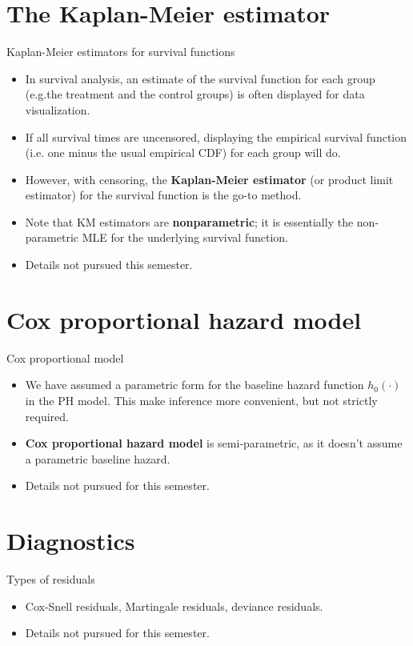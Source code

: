 \documentclass{beamer}
\newcommand{\currentsection}{}
\let\oldsection\section
\renewcommand{\section}[1]{\oldsection{#1}\renewcommand{\currentsection}{#1}}
\newenvironment{wideitemize}%
  {\begin{itemize}%
    \setlength{\parskip}{1em}}%
  {\end{itemize}}
\begin{document}
\section{The Kaplan-Meier estimator}

\begin{frame} {Kaplan-Meier estimators for survival functions}
\begin{wideitemize}
\item  In survival analysis,  an estimate of the survival function for each group (e.g.the  treatment and the control groups) is often displayed for data visualization. 


\item  If all survival times are uncensored, displaying the empirical survival function (i.e. one minus the usual empirical CDF) for each group will do. 

\item However, with censoring, the {\bf Kaplan-Meier estimator} (or product limit estimator) for the survival function is the go-to method. 


\item Note that KM estimators are {\bf nonparametric};  it is essentially the non-parametric MLE for the  underlying survival function. 


\item Details not pursued this semester. 
\end{wideitemize}

\end{frame}


\section{Cox proportional hazard model}

\begin{frame} {Cox proportional model}

\begin{wideitemize}

\item We have assumed a parametric form for the baseline hazard function $h_0 (\cdot)$ in the PH model. This make inference more convenient, but not strictly required. 

\item {\bf Cox proportional hazard model} is semi-parametric, as it doesn't assume a parametric baseline hazard. 


\item Details not pursued for this semester. 

\end{wideitemize}



\end{frame}


\section{Diagnostics}

\begin{frame} {Types of residuals}
\begin{itemize}

\item Cox-Snell residuals, Martingale residuals, deviance residuals. 

\item Details not pursued for this semester. 

\end{itemize}
\end{frame}
\end{document}
